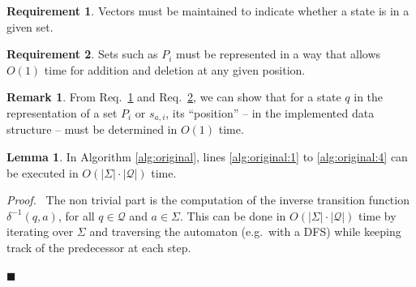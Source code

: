 \documentclass[12pt, a4 paper]{article}
\renewenvironment{proof}[1][Proof]{\begin{mdframed}[backgroundcolor=black!5, topline=false, rightline=false, bottomline=false, linecolor=black!15, linewidth=3pt]{\noindent\textit{#1.}\ }}{\noindent\par\hfill$\blacksquare$\end{mdframed}}
\theoremstyle{definition}
\newtheorem{lemma}{Lemma}
\newtheorem{remark}{Remark}
\newtheorem{requirement}{Requirement}
\begin{document}
\begin{requirement}
    \label{req:2}
Vectors must be maintained to indicate whether a state is in a given set.
\end{requirement}

\begin{requirement}
    \label{req:3}
Sets such as $P_i$ must be represented in a way that allows $O(1)$ time for addition and deletion at any given position.
\end{requirement}

\begin{remark}
    \label{req:4}
From Req.\ \ref{req:2} and Req.\ \ref{req:3}, we can show that for a state $q$ in the representation of a set $P_i$ or $s_{a,i}$, its ``position'' -- in the implemented data structure -- must be determined in $O(1)$ time.
\end{remark}

\bigskip

\begin{lemma}
    In Algorithm \ref{alg:original}, lines \ref{alg:original:1} to \ref{alg:original:4} can be executed in $O(\left| \Sigma \right| \cdot \left| \mathcal{Q} \right|)$ time.
\end{lemma}
\begin{proof}
    The non trivial part is the computation of the inverse transition function $\delta^{-1}(q, a)$, for all $q \in \mathcal{Q}$ and $a \in \Sigma$. This can be done in $O(\left| \Sigma \right| \cdot \left| \mathcal{Q} \right|)$ time by iterating over $\Sigma$ and traversing the automaton (e.g.\ with a DFS) while keeping track of the predecessor at each step.
\end{proof}

\bigskip
\end{document}
